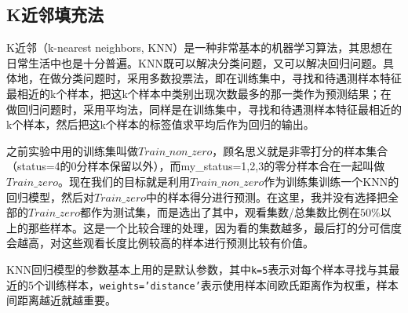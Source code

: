 \subsection{K近邻填充法}
K近邻（k-nearest neighbors, KNN）是一种非常基本的机器学习算法，其思想在日常生活中也是十分普遍。KNN既可以解决分类问题，又可以解决回归问题。具体地，在做分类问题时，采用多数投票法，即在训练集中，寻找和待遇测样本特征最相近的k个样本，把这k个样本中类别出现次数最多的那一类作为预测结果；在做回归问题时，采用平均法，同样是在训练集中，寻找和待遇测样本特征最相近的k个样本，然后把这k个样本的标签值求平均后作为回归的输出。

之前实验中用的训练集叫做$Train\_non\_zero$，顾名思义就是非零打分的样本集合（status=4的0分样本保留以外），而my\_status=1,2,3的零分样本合在一起叫做$Train\_zero$。现在我们的目标就是利用$Train\_non\_zero$作为训练集训练一个KNN的回归模型，然后对$Train\_zero$中的样本得分进行预测。在这里，我并没有选择把全部的$Train\_zero$都作为测试集，而是选出了其中，观看集数/总集数比例在$50\%$以上的那些样本。这是一个比较合理的处理，因为看的集数越多，最后打的分可信度会越高，对这些观看长度比例较高的样本进行预测比较有价值。

KNN回归模型的参数基本上用的是默认参数，其中\texttt{k=5}表示对每个样本寻找与其最近的5个训练样本，\texttt{weights='distance'}表示使用样本间欧氏距离作为权重，样本间距离越近就越重要。

